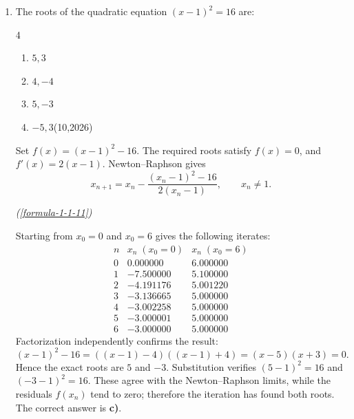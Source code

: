 \begin{enumerate}[label={},font=\normalfont,leftmargin=1.15cm,labelwidth=1.0cm,labelsep=0.15cm,itemindent=0pt,listparindent=0pt,parsep=0pt,topsep=0pt]
\item[1.2.1] The roots of the quadratic equation $(x-1)^2=16$ are:

\begin{multicols}{4}
\begin{enumerate}
\setlength{\itemsep}{0pt}
    \item $5,3$
    \item $4,-4$
    \item $5,-3$
    \item $-5,3$\nobreak\hfill\mbox{(10,2026)}
\end{enumerate}
\end{multicols}



\vspace{0.6em}\par\solution

Set $f(x)=(x-1)^2-16$. The required roots satisfy $f(x)=0$, and $f'(x)=2(x-1)$. Newton--Raphson gives
\[
x_{n+1}=x_n-\frac{(x_n-1)^2-16}{2(x_n-1)},\qquad x_n\ne1.
\]
\par\noindent\hfill\mbox{\textit{(\ref{formula-1-1-11})}}\par
Starting from $x_0=0$ and $x_0=6$ gives the following iterates:
\[
\begin{array}{c|r|r}
n & x_n\;(x_0=0) & x_n\;(x_0=6)\\\hline
0 & 0.000000 & 6.000000\\
1 & -7.500000 & 5.100000\\
2 & -4.191176 & 5.001220\\
3 & -3.136665 & 5.000000\\
4 & -3.002258 & 5.000000\\
5 & -3.000001 & 5.000000\\
6 & -3.000000 & 5.000000
\end{array}
\]
Factorization independently confirms the result:
\[
(x-1)^2-16=((x-1)-4)((x-1)+4)=(x-5)(x+3)=0.
\]
Hence the exact roots are $5$ and $-3$. Substitution verifies $(5-1)^2=16$ and $(-3-1)^2=16$. These agree with the Newton--Raphson limits, while the residuals $f(x_n)$ tend to zero; therefore the iteration has found both roots. The correct answer is \textbf{c)}.


\end{enumerate}
